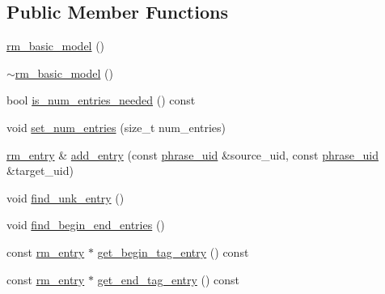 \subsection*{Public Member Functions}
\begin{DoxyCompactItemize}
\item 
\hyperlink{classuva_1_1smt_1_1bpbd_1_1server_1_1rm_1_1models_1_1rm__basic__model_ab80e9cf546e8cadf421663fa156b0ec8}{rm\+\_\+basic\+\_\+model} ()
\item 
\hyperlink{classuva_1_1smt_1_1bpbd_1_1server_1_1rm_1_1models_1_1rm__basic__model_a0498439e90c2f8ddf2ff96a6096f8007}{$\sim$rm\+\_\+basic\+\_\+model} ()
\item 
bool \hyperlink{classuva_1_1smt_1_1bpbd_1_1server_1_1rm_1_1models_1_1rm__basic__model_aa092aae841128e63d908605f24f3d56d}{is\+\_\+num\+\_\+entries\+\_\+needed} () const 
\item 
void \hyperlink{classuva_1_1smt_1_1bpbd_1_1server_1_1rm_1_1models_1_1rm__basic__model_aea5dcce2888f98e003a8e0749ad7a53a}{set\+\_\+num\+\_\+entries} (size\+\_\+t num\+\_\+entries)
\item 
\hyperlink{namespaceuva_1_1smt_1_1bpbd_1_1server_1_1rm_1_1models_a67353bb21590b2a2adf05500899439ed}{rm\+\_\+entry} \& \hyperlink{classuva_1_1smt_1_1bpbd_1_1server_1_1rm_1_1models_1_1rm__basic__model_a225e4e587d76ac58432ebfefb66bf3ab}{add\+\_\+entry} (const \hyperlink{namespaceuva_1_1smt_1_1bpbd_1_1server_ad18d4cdf5504e76c22b0c124ff60b44f}{phrase\+\_\+uid} \&source\+\_\+uid, const \hyperlink{namespaceuva_1_1smt_1_1bpbd_1_1server_ad18d4cdf5504e76c22b0c124ff60b44f}{phrase\+\_\+uid} \&target\+\_\+uid)
\item 
void \hyperlink{classuva_1_1smt_1_1bpbd_1_1server_1_1rm_1_1models_1_1rm__basic__model_accf977e9288a3a4a99aca62b84ace304}{find\+\_\+unk\+\_\+entry} ()
\item 
void \hyperlink{classuva_1_1smt_1_1bpbd_1_1server_1_1rm_1_1models_1_1rm__basic__model_ad2cb6b926889edb9c1cae55bd86c7507}{find\+\_\+begin\+\_\+end\+\_\+entries} ()
\item 
const \hyperlink{namespaceuva_1_1smt_1_1bpbd_1_1server_1_1rm_1_1models_a67353bb21590b2a2adf05500899439ed}{rm\+\_\+entry} $\ast$ \hyperlink{classuva_1_1smt_1_1bpbd_1_1server_1_1rm_1_1models_1_1rm__basic__model_a7d80a25070379ca448bdd25e49b42a44}{get\+\_\+begin\+\_\+tag\+\_\+entry} () const 
\item 
const \hyperlink{namespaceuva_1_1smt_1_1bpbd_1_1server_1_1rm_1_1models_a67353bb21590b2a2adf05500899439ed}{rm\+\_\+entry} $\ast$ \hyperlink{classuva_1_1smt_1_1bpbd_1_1server_1_1rm_1_1models_1_1rm__basic__model_a278b9dbfcc3eb3e44202fb612d6e6daf}{get\+\_\+end\+\_\+tag\+\_\+entry} () const 

\end{DoxyCompactItemize}
